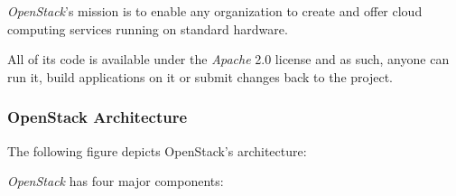 \textit{OpenStack}'s mission is to enable any organization to create and offer cloud computing services running on standard hardware.

All of its code is available under the \textit{Apache} 2.0 license and as such, anyone can run it, build applications on it or submit changes back to the project.

\subsubsection*{OpenStack Architecture} \label{openstack_arch}

The following figure depicts OpenStack's architecture:


\textit{OpenStack} has four major components:

